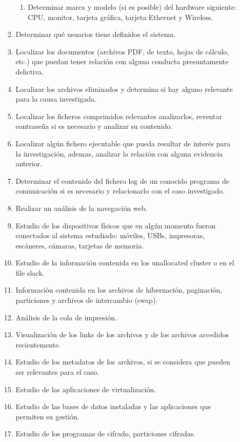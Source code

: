 \begin{enumerate}
\begin{enumerate}
\begin{enumerate}
\begin{enumerate}
                \item Determinar marca y modelo (si es posible) del hardware siguiente: CPU, monitor, tarjeta gráfica, tarjeta Ethernet y Wireless.
            \end{enumerate}
            \item Determinar qué usuarios tiene definidos el sistema.
            \item Localizar los documentos (archivos PDF, de texto, hojas de cálculo, etc.) que puedan tener relación con alguna conducta presuntamente delictiva.
            \item Localizar los archivos eliminados y determina si hay alguno relevante para la causa investigada.
            \item Localizar los ficheros comprimidos relevantes analizarlos, reventar contraseña si es necesario y analizar su contenido.
            \item Localizar algún fichero ejecutable que pueda resultar de interés para la investigación, ademas, analizar la relación con alguna evidencia anterior.
            \item Determinar el contenido del fichero log de un conocido programa de comunicación si es necesario y relacionarlo con el caso investigado.
            \item Realizar un análisis de la navegación web.
            \item Estudio de los dispositivos físicos que en algún momento fueron conectados al sistema estudiado: móviles, USBs, impresoras, escáneres, cámaras, tarjetas de memoria.
            \item Estudio de la información contenida en los unallocated cluster o en el file slack.
            \item Información contenida en los archivos de hibernación, paginación, particiones y archivos de intercambio (swap).
            \item Análisis de la cola de impresión.
            \item Visualización de los links de los archivos y de los archivos accedidos recientemente.
            \item Estudio de los metadatos de los archivos, si se considera que pueden ser relevantes para el caso.
            \item Estudio de las aplicaciones de virtualización.
            \item Estudio de las bases de datos instaladas y las aplicaciones que permiten su gestión.
            \item Estudio de los programas de cifrado, particiones cifradas.

\end{enumerate}
\end{enumerate}
\end{enumerate}
